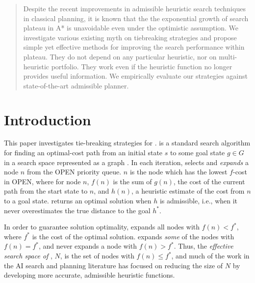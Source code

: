 

\begin{abstract}
Despite the recent improvements in admissible heuristic search techniques
in classical planning, it is known that the the exponential growth of
search plateau in A* is unavoidable even under the optimistic assumption.
We investigate various existing myth on tiebreaking
strategies and propose simple yet effective methods for improving the
search performance within plateau.
 They do not depend on any particular heuristic, nor
 on multi-heuristic portfolio.
 They work even if the heuristic
 function no longer provides useful information.
 We empirically evaluate our strategies against state-of-the-art admissible planner.
\end{abstract}

\section{Introduction}
\label{sec-1}




This paper investigates tie-breaking strategies for \astar.
\astar is a standard search algorithm for finding an optimal-cost path 
from an initial state $s$ to some goal state $g \in G$ in a search space represented as a graph \cite{hart1968formal}.
In each iteration, \astar selects and \emph{expands} a node $n$ from the OPEN priority queue.
$n$ is the node which has the lowest $f$-cost in OPEN, where for node $n$, $f(n)$ is the sum of  $g(n)$, the cost of the current path from the start state to $n$, and $h(n)$, a heuristic estimate of the cost from $n$ to a goal state.
\astar returns an optimal solution when $h$ is admissible, i.e., when it
never overestimates the true distance to the goal $h^*$.

In order to guarantee solution optimality, \astar expands all
nodes with $f(n) < f^*$, where $f^*$ is the cost of the optimal solution.
\astar expands \emph{some} of the nodes with $f(n) = f^*$, and never expands a node with $f(n) > f^*$.
Thus, the \emph{effective search space of \astar}, $N$, is the set of nodes with 
$f(n) \leq f^*$, and
much of the work in the AI search and planning literature  has focused on reducing the size of $N$ by
developing more accurate, admissible heuristic functions.

